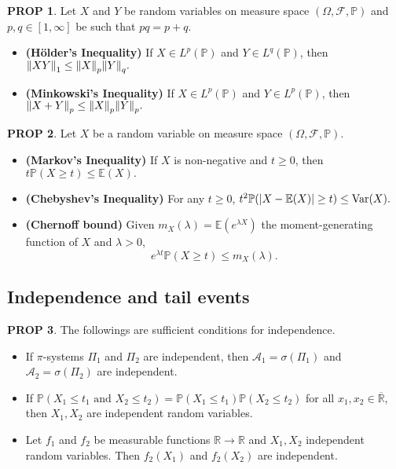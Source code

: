\documentclass[hidelinks,11pt]{article}
\theoremstyle{definition}
\theoremstyle{dotless}
\newtheorem{prop}{PROP}[section]
\theoremstyle{remark}
\DeclareMathOperator{\Var}{Var}
\DeclareMathOperator{\1}{\mathbf{1}}
\begin{document}
\begin{prop}
Let $X$ and $Y$ be random variables on measure space $(\Omega,\mathcal{F},\mathbb{P})$ and $p,q\in[1,\infty]$ be such that $pq=p+q$.
\begin{itemize}
    \item \textup{\textbf{(Hölder's Inequality)}} If $X\in L^p(\mathbb{P})$ and $Y\in L^q(\mathbb{P})$, then $\norm{XY}_1\leq\norm{X}_p\norm{Y}_q.$
    \item \textup{\textbf{(Minkowski's Inequality)}} If $X\in L^p(\mathbb{P})$ and $Y\in L^p(\mathbb{P})$, then $\norm{X+Y}_{p}\leq\norm{X}_p\norm{Y}_p.$
\end{itemize}
\end{prop}

\begin{prop}
Let $X$ be a random variable on measure space $(\Omega,\mathcal{F},\mathbb{P})$.
\begin{itemize}
    \item \textup{\textbf{(Markov's Inequality)}} If $X$ is non-negative and $t\geq0$, then $t\mathbb{P}(X\geq t)\leq\mathbb{E}(X).$
    \item \textup{\textbf{(Chebyshev's Inequality)}} For any $t\geq0$, $t^2\mathbb{P}(\abs{X-\mathbb{E}(X)}\geq t)\leq\Var(X).$
    \item \textup{\textbf{(Chernoff bound)}} Given $m_X(\lambda)=\mathbb{E}(e^{\lambda X})$ the moment-generating function of $X$ and $\lambda>0$,
    \[e^{\lambda t}\mathbb{P}(X\geq t)\leq m_X(\lambda).\]
\end{itemize}
\end{prop}

\subsection{Independence and tail events}

\begin{prop}The followings are sufficient conditions for independence.\begin{itemize}
    \item If $\pi$-systems $\Pi_1$ and $\Pi_2$ are  independent, then $\mathcal{A}_1=\sigma(\Pi_1)$ and $\mathcal{A}_2=\sigma(\Pi_2)$ are independent.
    \item If $\mathbb{P}(X_1\leq t_1\textrm{ and }X_2\leq t_2)=\mathbb{P}(X_1\leq t_1)\mathbb{P}(X_2\leq t_2)$ for all $x_1,x_2\in\overline{\mathbb{R}}$, then $X_1,X_2$ are independent random variables.
    \item Let $f_1$ and $f_2$ be measurable functions $\mathbb{R}\to\mathbb{R}$ and $X_1,X_2$ independent random variables. Then $f_2(X_1)$ and $f_2(X_2)$ are independent.
\end{itemize}
\end{prop}
\end{document}

